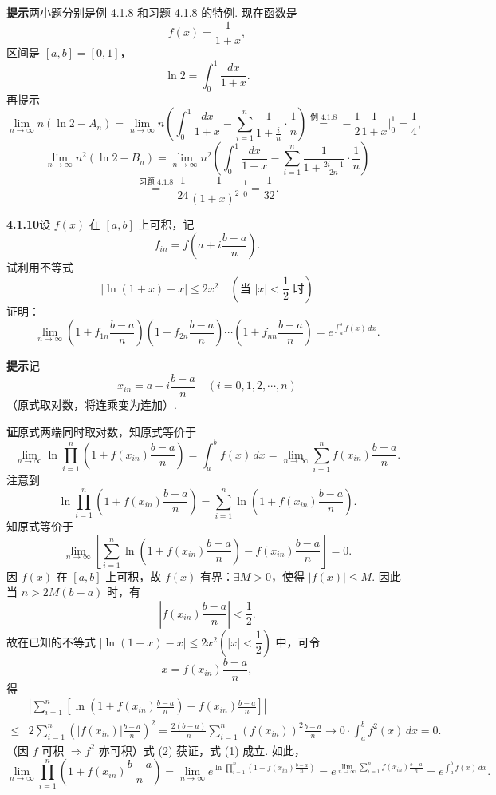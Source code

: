 \documentclass[UTF8, 12pt, fontset=fandol, oneside]{ctexart}
\begin{document}
\noindent\textbf{提示}\quad 两小题分别是例 4.1.8 和习题 4.1.8 的特例. 现在函数是
\[
f(x)=\frac1{1+x},
\]
区间是 $[a,b]=[0,1]$，
\[
\ln2=\int_0^1\frac{dx}{1+x}.
\]
再提示
\[
\lim_{n\to\infty}n(\ln2-A_n)
=\lim_{n\to\infty}n\left(\int_0^1\frac{dx}{1+x}
-\sum_{i=1}^n\frac1{1+\frac in}\cdot\frac1n\right)
\stackrel{\text{例 4.1.8}}{=}
-\frac12\frac1{1+x}\bigg|_0^1=\frac14,
\]
\[
\lim_{n\to\infty}n^2(\ln2-B_n)
=\lim_{n\to\infty}n^2\left(\int_0^1\frac{dx}{1+x}
-\sum_{i=1}^n\frac1{1+\frac{2i-1}{2n}}\cdot\frac1n\right)
\]
\[
\stackrel{\text{习题 4.1.8}}{=}
\frac1{24}\frac{-1}{(1+x)^2}\bigg|_0^1
=\frac1{32}.
\]

\noindent\textbf{4.1.10}\quad 设 $f(x)$ 在 $[a,b]$ 上可积，记
\[
f_{in}=f\left(a+i\frac{b-a}{n}\right).
\]
试利用不等式
\[
|\ln(1+x)-x|\le2x^2\quad\left(\text{当 }|x|<\frac12\text{ 时}\right)
\]
证明：
\[
\lim_{n\to\infty}
\left(1+f_{1n}\frac{b-a}{n}\right)
\left(1+f_{2n}\frac{b-a}{n}\right)\cdots
\left(1+f_{nn}\frac{b-a}{n}\right)
=e^{\int_a^b f(x)\,dx}.
\]

\noindent\textbf{提示}\quad 记
\[
x_{in}=a+i\frac{b-a}{n}\quad(i=0,1,2,\cdots,n)
\]
（原式取对数，将连乘变为连加）.

\noindent\textbf{证}\quad 原式两端同时取对数，知原式等价于
\[
\lim_{n\to\infty}\ln\prod_{i=1}^n
\left(1+f(x_{in})\frac{b-a}{n}\right)
=\int_a^b f(x)\,dx
=\lim_{n\to\infty}\sum_{i=1}^n f(x_{in})\frac{b-a}{n}.
\tag{1}
\]
注意到
\[
\ln\prod_{i=1}^n\left(1+f(x_{in})\frac{b-a}{n}\right)
=\sum_{i=1}^n\ln\left(1+f(x_{in})\frac{b-a}{n}\right).
\]
知原式等价于
\[
\lim_{n\to\infty}
\left[\sum_{i=1}^n
\ln\left(1+f(x_{in})\frac{b-a}{n}\right)
-f(x_{in})\frac{b-a}{n}\right]=0.
\tag{2}
\]
因 $f(x)$ 在 $[a,b]$ 上可积，故 $f(x)$ 有界：$\exists M>0$，使得 $|f(x)|\le M$. 因此当 $n>2M(b-a)$ 时，有
\[
\left|f(x_{in})\frac{b-a}{n}\right|<\frac12.
\]
故在已知的不等式 $|\ln(1+x)-x|\le2x^2\left(|x|<\dfrac12\right)$ 中，可令
\[
x=f(x_{in})\frac{b-a}{n},
\]
得
\[
\begin{aligned}
&\left|\sum_{i=1}^n\left[
\ln\left(1+f(x_{in})\frac{b-a}{n}\right)
-f(x_{in})\frac{b-a}{n}\right]\right|\\
\le{}&2\sum_{i=1}^n\left(|f(x_{in})|\frac{b-a}{n}\right)^2
=\frac{2(b-a)}{n}\sum_{i=1}^n(f(x_{in}))^2\frac{b-a}{n}
\longrightarrow0\cdot\int_a^b f^2(x)\,dx=0.
\end{aligned}
\]
（因 $f$ 可积 $\Rightarrow f^2$ 亦可积）式 (2) 获证，式 (1) 成立. 如此，
\[
\lim_{n\to\infty}\prod_{i=1}^n
\left(1+f(x_{in})\frac{b-a}{n}\right)
=\lim_{n\to\infty}
e^{\ln\prod_{i=1}^n(1+f(x_{in})\frac{b-a}{n})}
=e^{\lim_{n\to\infty}\sum_{i=1}^n f(x_{in})\frac{b-a}{n}}
=e^{\int_a^b f(x)\,dx}.
\]
\end{document}
